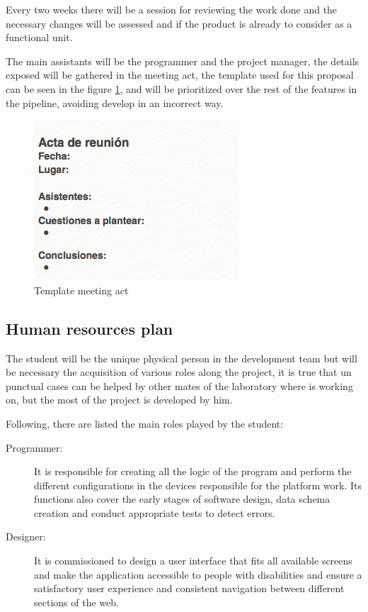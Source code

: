 \documentclass{DeustoFDP}
\begin{document}
Every two weeks there will be a session for reviewing the work done and the necessary changes will be assessed and if the product is already to consider as a functional unit.

\newpage
The main assistants will be the programmer and the project manager, the details exposed will be gathered in the meeting act, the template used for this proposal can be seen in the figure \ref{fig:Actareunion}, and will be prioritized over the rest of the features in the pipeline, avoiding develop in an incorrect way.

\begin{figure}[h]
	\centering
	\includegraphics[width=0.7\linewidth]{fig/Actareunion}
	\caption[Template meeting act]{Template meeting act}
	\label{fig:Actareunion}
\end{figure}
\subsection{Human resources plan}
The student will be the unique physical person in the development team but will be necessary the acquisition of various roles along the project, it is true that un punctual cases can be helped by other mates of the laboratory where is working on, but the most of the project is developed by him.

Following, there are listed the main roles played by the student:

\begin{description}
	\item[Programmer:] It is responsible for creating all the logic of the program and perform the different configurations in the devices responsible for the platform work. Its functions also cover the early stages of software design, data schema creation and conduct appropriate tests to detect errors.
	
	\item[Designer:] It is commissioned to design a user interface that fits all available screens and make the application accessible to people with disabilities and ensure a satisfactory user experience and consistent navigation between different sections of the web.
\end{description}
\end{document}
